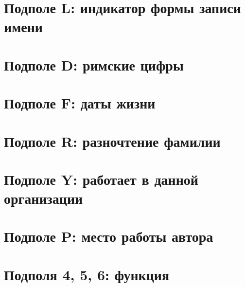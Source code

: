 \section{Подполе L: индикатор формы записи имени}

\section{Подполе D: римские цифры}

\section{Подполе F: даты жизни}

\section{Подполе R: разночтение фамилии}

\section{Подполе Y: работает в данной организации}

\section{Подполе P: место работы автора}

\section{Подполя 4, 5, 6: функция}


